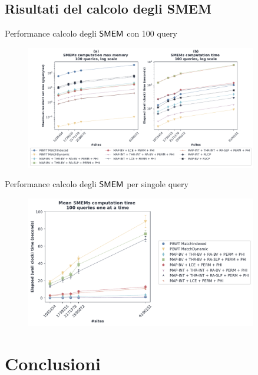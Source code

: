 \documentclass[]{beamer}
\def\SMEM{\mbox{\rm {\sf SMEM}}}
\begin{document}
\subsection{Risultati del calcolo degli SMEM}
\begin{frame}{Performance calcolo degli $\SMEM$ con 100 query}
  \begin{figure}[H]
    \centering
    \includegraphics[width=0.9\textwidth]{img/exe_time_mem_paper.pdf}
  \end{figure}
\end{frame}
\begin{frame}{Performance calcolo degli $\SMEM$ per singole query}
  \begin{figure}[H]
    \centering
    \includegraphics[width=0.9\textwidth]{img/exe_time_single_paper.pdf}
  \end{figure}
\end{frame}
\section{Conclusioni}
\end{document}
